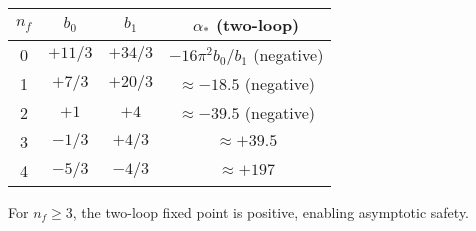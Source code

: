 \documentclass[11pt,a4paper]{article}
\numberwithin{equation}{section}
\theoremstyle{plain}
\theoremstyle{definition}
\theoremstyle{remark}
\begin{document}
\begin{center}
\begin{tabular}{cccc}
\toprule
$n_f$ & $b_0$ & $b_1$ & $\alpha_*$ (two-loop) \\
\midrule
0 & $+11/3$ & $+34/3$ & $-16\pi^2 b_0/b_1$ (negative) \\
1 & $+7/3$ & $+20/3$ & $\approx -18.5$ (negative) \\
2 & $+1$ & $+4$ & $\approx -39.5$ (negative) \\
3 & $-1/3$ & $+4/3$ & $\approx +39.5$ \\
4 & $-5/3$ & $-4/3$ & $\approx +197$ \\
\bottomrule
\end{tabular}
\end{center}

For $n_f\geq 3$, the two-loop fixed point is positive, enabling asymptotic safety.
\end{document}
